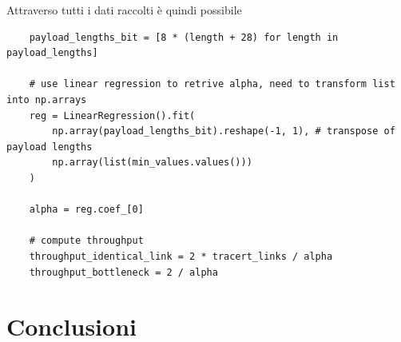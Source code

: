 Attraverso tutti i dati raccolti è quindi possibile 

\begin{lstlisting}
    payload_lengths_bit = [8 * (length + 28) for length in payload_lengths]

    # use linear regression to retrive alpha, need to transform list into np.arrays
    reg = LinearRegression().fit(
        np.array(payload_lengths_bit).reshape(-1, 1), # transpose of payload lengths
        np.array(list(min_values.values())) 
    )

    alpha = reg.coef_[0]

    # compute throughput
    throughput_identical_link = 2 * tracert_links / alpha
    throughput_bottleneck = 2 / alpha
\end{lstlisting}





\vspace{35px}\section{Conclusioni}




